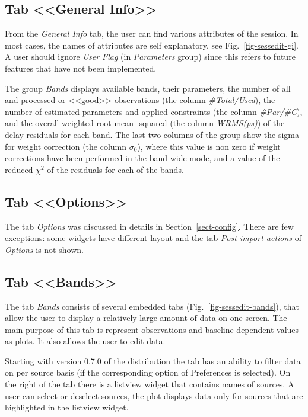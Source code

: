 \documentclass [10pt,letterpaper]{report}
\begin{document}
%
\subsection{Tab <<General Info>>}
From the {\sl General Info} tab, the user can find various attributes
of the session. In most cases, the names of attributes are self
explanatory, see Fig.~\ref{fig-sessedit-gi}. A user should ignore
{\sl User Flag} (in {\sl Parameters} group) since this refers to future
features that have not been implemented.

The group {\sl Bands} displays available bands, their parameters, the
number of all and processed or <<good>> observations (the column {\sl
\#Total/Used}), the number of estimated parameters and applied
constraints (the column {\sl \#Par/\#C}), and the overall weighted
root-mean- squared (the column {\sl WRMS(ps)}) of the delay residuals
for each band. The last two columns of the group show the sigma for
weight correction (the column {\sl $\sigma_0$}), where this value is non
zero if weight corrections have been performed in the band-wide mode,
and a value of the reduced $\chi^2$ of the residuals for each of the bands.



%
\subsection{Tab <<Options>>}
\label{subsect-sessedit-options}
The tab {\sl Options} was discussed in details in Section~\ref{sect-config}.
There are few exceptions: some widgets have different layout and the
tab {\sl Post import actions} of {\sl Options} is not shown.

%
\subsection{Tab <<Bands>>}
\label{subsect-sessedit-bands}
The tab {\sl Bands} consists of several embedded tabs
(Fig.~\ref{fig-sessedit-bands}), that allow the user to display a
relatively large amount of data on one screen. The main purpose of this
tab is represent observations and baseline dependent values as plots. It
also allows the user to edit data.

Starting with version 0.7.0 of the distribution the tab has an ability to filter
data on per source basis (if the corresponding option of Preferences is selected).
On the right of the tab there is a listview widget that contains names of sources.
A user can select or deselect sources, the plot displays data only for sources
that are highlighted in the listview widget.
\end{document}
